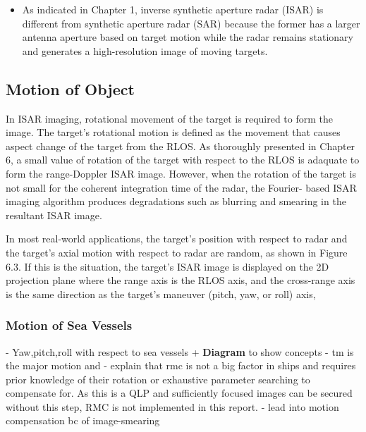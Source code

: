 \documentclass[class=report,11pt,crop=false]{standalone}
\begin{document}
    \begin{itemize}
        \item As indicated in Chapter 1, inverse synthetic aperture radar (ISAR) is different from synthetic aperture radar (SAR) because the former has a larger antenna aperture based on target motion while the radar remains stationary and generates a high-resolution image of moving targets. %
    \end{itemize}

    \subsection{Motion of Object}
    In ISAR imaging, rotational movement of the target is required to form the image.
    The target’s rotational motion is defined as the movement that causes aspect change of the target from the RLOS. As thoroughly presented in Chapter 6, a small value of rotation of the target with respect to the RLOS is adaquate to form the range-Doppler ISAR image. However, when the rotation of the target is not small for the coherent integration time of the radar, the Fourier- based ISAR imaging algorithm produces degradations such as blurring and smearing in the resultant ISAR image.
    
    In most real-world applications, the target’s position with respect to radar and the target’s axial motion with respect to radar are random, as shown in Figure 6.3. If this is the situation, the target’s ISAR image is displayed on the 2D projection plane where the range axis is the RLOS axis, and the cross-range axis is the same direction as the target’s maneuver (pitch, yaw, or roll) axis,
    \subsubsection{Motion of Sea Vessels}
    - Yaw,pitch,roll with respect to sea vessels + \textbf{Diagram} to show concepts
    - tm is the major motion and 
    - explain that rmc is not a big factor in ships and requires prior knowledge of their rotation or exhaustive parameter searching to compensate for. As this is a QLP and sufficiently focused images can be secured without this step, RMC is not implemented in this report.
    - lead into motion compensation bc of image-smearing
    

\end{document}

